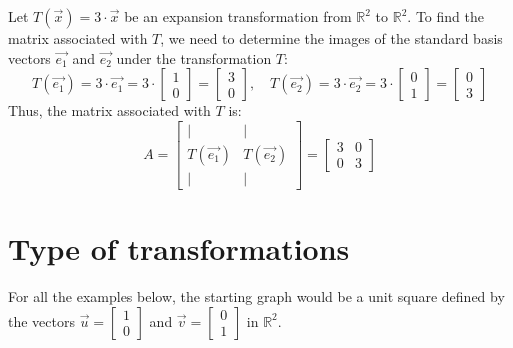 \begin{eg}
    Let $T(\vec{x}) = 3 \cdot \vec{x}$ be an expansion transformation from $\mathbb{R}^2$ to $\mathbb{R}^2$. To find the matrix associated with $T$, we need to determine the images of the standard basis vectors $\vec{e_1}$ and $\vec{e_2}$ under the transformation $T$:
    \[
        T(\vec{e_1}) = 3 \cdot \vec{e_1} = 3 \cdot \begin{bmatrix} 1 \\ 0 \end{bmatrix} = \begin{bmatrix} 3 \\ 0 \end{bmatrix}, \quad T(\vec{e_2}) = 3 \cdot \vec{e_2} = 3 \cdot \begin{bmatrix} 0 \\ 1 \end{bmatrix} = \begin{bmatrix} 0 \\ 3 \end{bmatrix}
    \]
    Thus, the matrix associated with $T$ is:
    \[
        A = \begin{bmatrix} | & | \\ T(\vec{e_1}) & T(\vec{e_2}) \\ | & | \end{bmatrix} = \begin{bmatrix} 3 & 0 \\ 0 & 3 \end{bmatrix}
    \]
\end{eg}

\section{Type of transformations}
For all the examples below, the starting graph would be a unit square defined by the vectors $\vec{u} = \begin{bmatrix} 1 \\ 0 \end{bmatrix}$ and $\vec{v} = \begin{bmatrix} 0 \\ 1 \end{bmatrix}$ in $\mathbb{R}^2$.
\begin{center}
\end{center}

